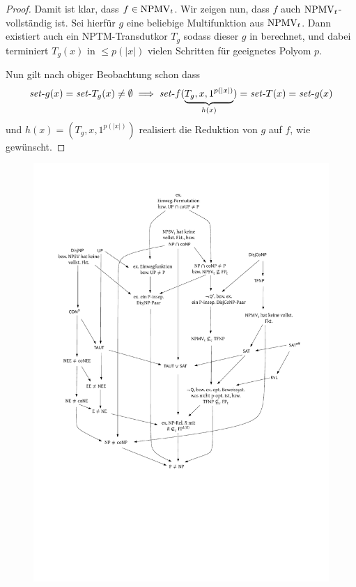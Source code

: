 \begin{proof}
    Damit ist klar, dass $f\in\mathrm{NPMV}_t$.
    Wir zeigen nun, dass $f$ auch $\mathrm{NPMV}_t$-vollständig ist.
    Sei hierfür $g$ eine beliebige Multifunktion aus $\mathrm{NPMV}_t$.
    Dann existiert auch ein NPTM-Transdutkor $T_g$ sodass dieser $g$ in berechnet, und dabei terminiert $T_g(x)$ in $\leq p(|x|)$ vielen Schritten für geeignetes Polyom $p$.

    Nun gilt nach obiger Beobachtung schon dass 
    \[ \mathit{set}\text{-}{g}(x) = \mathit{set}\text{-}{T_g}(x)\neq\emptyset \implies \mathit{set}\text{-}{f}(\underbrace{T_g, x, 1^{p(|x|)}}_{h(x)})=\mathit{set}\text{-}{T}(x)=\mathit{set}\text{-}{g}(x) \]
    und $h(x)=(T_g, x, 1^{p(|x|)})$ realisiert die Reduktion von $g$ auf $f$, wie gewünscht.
\end{proof}

\begin{figure}[p]
    \includegraphics[page=7]{figures.pdf}
    \vspace*{-5cm}
    \caption[]{
}
\end{figure}
